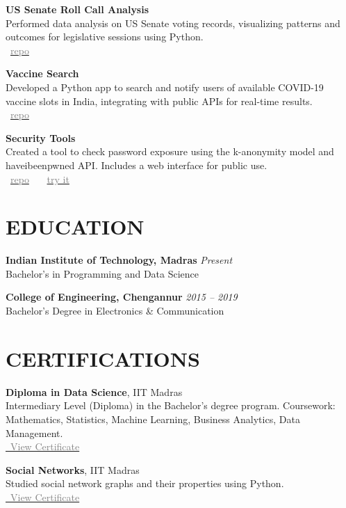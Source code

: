 \documentclass[11pt,a4paper]{article}
\begin{document}
\textbf{US Senate Roll Call Analysis} \\
Performed data analysis on US Senate voting records, visualizing patterns and outcomes for legislative sessions using Python. \\
\faGithub~\href{https://github.com/jishnujp/US_senate_roll_call}{\textcolor{gray}{repo}} 

\textbf{Vaccine Search} \\
Developed a Python app to search and notify users of available COVID-19 vaccine slots in India, integrating with public APIs for real-time results. \\
\faGithub~\href{https://github.com/jishnujp/vaccine_search}{\textcolor{gray}{repo}} 

\textbf{Security Tools} \\
Created a tool to check password exposure using the k-anonymity model and haveibeenpwned API. Includes a web interface for public use. \\
\faGithub~\href{https://github.com/jishnujp/securityTools}{\textcolor{gray}{repo}} \, \textbar{} \,
\faGlobe~\href{https://jishnujp.github.io/securityTools}{\textcolor{gray}{try it}} 

\section*{EDUCATION}
\textbf{Indian Institute of Technology, Madras} \hfill \textit{Present} \\
Bachelor's in Programming and Data Science

\textbf{College of Engineering, Chengannur} \hfill \textit{2015 -- 2019} \\
Bachelor's Degree in Electronics \& Communication

\section*{CERTIFICATIONS}
\textbf{Diploma in Data Science}, IIT Madras \\
Intermediary Level (Diploma) in the Bachelor's degree program. Coursework: Mathematics, Statistics, Machine Learning, Business Analytics, Data Management. \\
\href{https://jishnujp.github.io/certificates/data_science_diploma.pdf}{\faFilePdfO~\textcolor{gray}{View Certificate}}

\textbf{Social Networks}, IIT Madras \\
Studied social network graphs and their properties using Python. \\
\href{https://archive.nptel.ac.in/content/noc/NOC22/SEM1/Ecertificates/106/noc22-cs30/Course/NPTEL22CS30S4373058402018648.jpg}{\faFilePdfO~\textcolor{gray}{View Certificate}}
\end{document}

